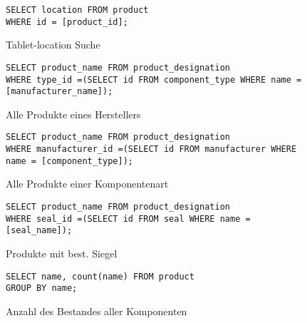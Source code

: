 \documentclass{article}
\begin{document}
\begin{figure}[!h]
\caption{Tablet-location Suche}
\begin{lstlisting}
SELECT location FROM product
WHERE id = [product_id];
\end{lstlisting}
\end{figure}
\begin{figure}[!h]
\caption{Alle Produkte eines Herstellers}
\begin{lstlisting}
SELECT product_name FROM product_designation
WHERE type_id =(SELECT id FROM component_type WHERE name = [manufacturer_name]);
\end{lstlisting}
\end{figure}
\begin{figure}[!h]
\caption{Alle Produkte einer Komponentenart}
\begin{lstlisting}
SELECT product_name FROM product_designation
WHERE manufacturer_id =(SELECT id FROM manufacturer WHERE name = [component_type]);
\end{lstlisting}
\end{figure}
\begin{figure}[!h]
\caption{Produkte mit best. Siegel}
\begin{lstlisting}
SELECT product_name FROM product_designation
WHERE seal_id =(SELECT id FROM seal WHERE name = [seal_name]);
\end{lstlisting}
\end{figure}
\begin{figure}[!h]
\caption{Anzahl des Bestandes aller Komponenten}
\begin{lstlisting}
SELECT name, count(name) FROM product 
GROUP BY name;
\end{lstlisting}
\end{figure}
\end{document}
